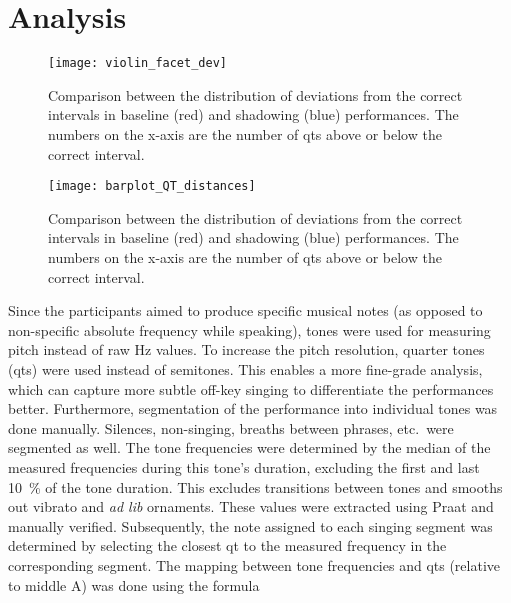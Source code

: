 
\section{Analysis}
\label{sec:analysis_music}

\begin{figure}[t]
	\centering
	\texttt{[image: violin\_facet\_dev]}
	\caption[Summary of within-participant interval deviation distribution]
		{Comparison between the distribution of deviations from the correct intervals in baseline (red) and shadowing (blue) performances.
		The numbers on the x-axis are the number of \acp{qt} above or below the correct interval.}
	\label{fig:violin_facet_dev}
\end{figure}

\begin{figure}[t]
	\centering
	\texttt{[image: barplot\_QT\_distances]}
	\caption[Distribution of interval deviations]
	{Comparison between the distribution of deviations from the correct intervals in baseline (red) and shadowing (blue) performances.
		The numbers on the x-axis are the number of \acp{qt} above or below the correct interval.}
	\label{fig:barplot_QT_distances}
\end{figure}

Since the participants aimed to produce specific musical notes (as opposed to non-specific absolute frequency while speaking), tones were used for measuring pitch instead of raw \si{\hertz} values.
To increase the pitch resolution, quarter tones (\acp{qt}) were used instead of semitones.
This enables a more fine-grade analysis, which can capture more subtle off-key singing to differentiate the performances better.
Furthermore, segmentation of the performance into individual tones was done manually.
Silences, non-singing, breaths between phrases, etc.\ were segmented as well.
The tone frequencies were determined by the median of the measured frequencies during this tone's duration, excluding the first and last \SI{10}{\percent} of the tone duration.
This excludes transitions between tones and smooths out vibrato and \textit{ad lib} ornaments.
These values were extracted using Praat \citep{Boersma2001praat} and manually verified.
Subsequently, the note assigned to each singing segment was determined by selecting the closest \ac{qt} to the measured frequency in the corresponding segment.
The mapping between tone frequencies and \acp{qt} (relative to middle A) was done using the formula

